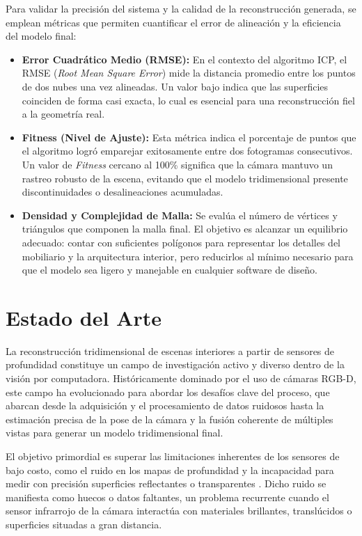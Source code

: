 \documentclass[12pt, a4, twoside, openany]{report}
\begin{document}
Para validar la precisión del sistema y la calidad de la reconstrucción generada, se emplean métricas que permiten cuantificar el error de alineación y la eficiencia del modelo final:

\begin{itemize}
    \item \textbf{Error Cuadrático Medio (RMSE):} En el contexto del algoritmo ICP, el RMSE (\textit{Root Mean Square Error}) mide la distancia promedio entre los puntos de dos nubes una vez alineadas. Un valor bajo indica que las superficies coinciden de forma casi exacta, lo cual es esencial para una reconstrucción fiel a la geometría real.
    \item \textbf{Fitness (Nivel de Ajuste):} Esta métrica indica el porcentaje de puntos que el algoritmo logró emparejar exitosamente entre dos fotogramas consecutivos. Un valor de \textit{Fitness} cercano al 100\% significa que la cámara mantuvo un rastreo robusto de la escena, evitando que el modelo tridimensional presente discontinuidades o desalineaciones acumuladas.
    \item \textbf{Densidad y Complejidad de Malla:} Se evalúa el número de vértices y triángulos que componen la malla final. El objetivo es alcanzar un equilibrio adecuado: contar con suficientes polígonos para representar los detalles del mobiliario y la arquitectura interior, pero reducirlos al mínimo necesario para que el modelo sea ligero y manejable en cualquier software de diseño.
\end{itemize}

\newpage 

\chapter{Estado del Arte}

La reconstrucción tridimensional de escenas interiores a partir de sensores de profundidad constituye un campo de investigación activo y diverso dentro de la visión por computadora. Históricamente dominado por el uso de cámaras RGB-D, este campo ha evolucionado para abordar los desafíos clave del proceso, que abarcan desde la adquisición y el procesamiento de datos ruidosos hasta la estimación precisa de la pose de la cámara y la fusión coherente de múltiples vistas para generar un modelo tridimensional final.

El objetivo primordial es superar las limitaciones inherentes de los sensores de bajo costo, como el ruido en los mapas de profundidad y la incapacidad para medir con precisión superficies reflectantes o transparentes \cite{afzal2025improving}. Dicho ruido se manifiesta como huecos o datos faltantes, un problema recurrente cuando el sensor infrarrojo de la cámara interactúa con materiales brillantes, translúcidos o superficies situadas a gran distancia.
\end{document}
